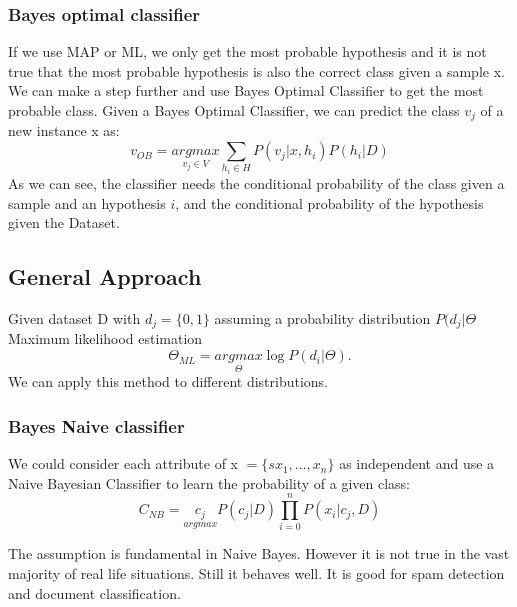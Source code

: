 \subsubsection{Bayes optimal classifier}
If we use MAP or ML, we only get the most probable hypothesis and it is not true that the most probable hypothesis is also the correct class given a sample x. We can make a step further and use Bayes Optimal Classifier to get the most probable class. Given a Bayes Optimal Classifier, we can predict the class $v_{j}$ of a new instance x as:
\[v_{OB} = \underset{v_{j} \in V}{arg max}\sum_{h_{i} \in H}P(v_{j}|x, h_{i})P(h_{i}|D)\]
As we can see, the classifier needs the conditional probability of the class given a sample and an hypothesis $i$, and the conditional probability of the hypothesis given the Dataset.

\subsection{General Approach}
Given dataset D with $d_{j} = \{0,1\}$ assuming a probability distribution $P(d_{j}|\Theta$ \\
Maximum likelihood estimation
\[\Theta _{ML} = \underset{\Theta}{argmax}\log P(d_{i}|\Theta).\]
We can apply this method to different distributions.

\subsubsection{Bayes Naive classifier}
We could consider each attribute of x $= \{sx_{1}, \dots, x_{n}\}$ as independent and use a Naive Bayesian Classifier to learn the probability of a given class:
\begin{equation}
    C_{NB} = \underset{argmax}{c_{j}} P(c_{j}|D) \prod_{i=0}^{n} P(x_{i}|c_{j}, D)
\end{equation}

The assumption is fundamental in Naive Bayes. However it is not true in the vast majority of real life situations. Still it behaves well. It is good for spam detection and document classification.
